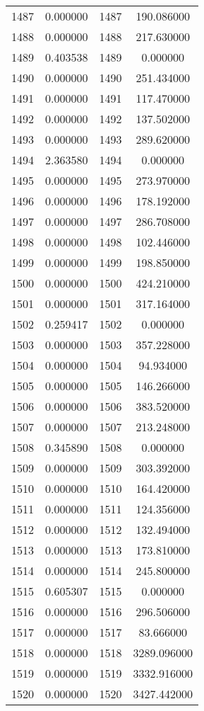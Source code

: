 \documentclass[12pt]{article}
\begin{document}
\begin{longtable}{@{}cccc@{}}
1487 & 0.000000 & 1487 & 190.086000 \\
1488 & 0.000000 & 1488 & 217.630000 \\
1489 & 0.403538 & 1489 & 0.000000 \\
1490 & 0.000000 & 1490 & 251.434000 \\
1491 & 0.000000 & 1491 & 117.470000 \\
1492 & 0.000000 & 1492 & 137.502000 \\
1493 & 0.000000 & 1493 & 289.620000 \\
1494 & 2.363580 & 1494 & 0.000000 \\
1495 & 0.000000 & 1495 & 273.970000 \\
1496 & 0.000000 & 1496 & 178.192000 \\
1497 & 0.000000 & 1497 & 286.708000 \\
1498 & 0.000000 & 1498 & 102.446000 \\
1499 & 0.000000 & 1499 & 198.850000 \\
1500 & 0.000000 & 1500 & 424.210000 \\
1501 & 0.000000 & 1501 & 317.164000 \\
1502 & 0.259417 & 1502 & 0.000000 \\
1503 & 0.000000 & 1503 & 357.228000 \\
1504 & 0.000000 & 1504 & 94.934000 \\
1505 & 0.000000 & 1505 & 146.266000 \\
1506 & 0.000000 & 1506 & 383.520000 \\
1507 & 0.000000 & 1507 & 213.248000 \\
1508 & 0.345890 & 1508 & 0.000000 \\
1509 & 0.000000 & 1509 & 303.392000 \\
1510 & 0.000000 & 1510 & 164.420000 \\
1511 & 0.000000 & 1511 & 124.356000 \\
1512 & 0.000000 & 1512 & 132.494000 \\
1513 & 0.000000 & 1513 & 173.810000 \\
1514 & 0.000000 & 1514 & 245.800000 \\
1515 & 0.605307 & 1515 & 0.000000 \\
1516 & 0.000000 & 1516 & 296.506000 \\
1517 & 0.000000 & 1517 & 83.666000 \\
1518 & 0.000000 & 1518 & 3289.096000 \\
1519 & 0.000000 & 1519 & 3332.916000 \\
1520 & 0.000000 & 1520 & 3427.442000 \\

\end{longtable}
\end{document}
